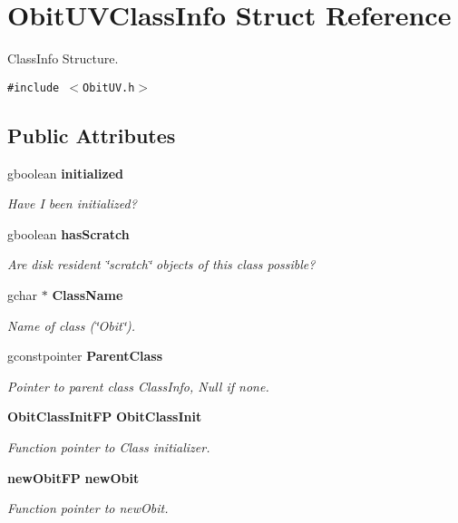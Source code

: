 \section{Obit\-UVClass\-Info Struct Reference}
\label{structObitUVClassInfo}
Class\-Info Structure.  


{\tt \#include $<$Obit\-UV.h$>$}

\subsection*{Public Attributes}
\begin{CompactItemize}
\item 
gboolean {\bf initialized}
\begin{CompactList}\small\item\em Have I been initialized? \item\end{CompactList}\item 
gboolean {\bf has\-Scratch}
\begin{CompactList}\small\item\em Are disk resident \char`\"{}scratch\char`\"{} objects of this class possible? \item\end{CompactList}\item 
gchar $\ast$ {\bf Class\-Name}
\begin{CompactList}\small\item\em Name of class (\char`\"{}Obit\char`\"{}). \item\end{CompactList}\item 
gconstpointer {\bf Parent\-Class}
\begin{CompactList}\small\item\em Pointer to parent class Class\-Info, Null if none. \item\end{CompactList}\item 
{\bf Obit\-Class\-Init\-FP} {\bf Obit\-Class\-Init}
\begin{CompactList}\small\item\em Function pointer to Class initializer. \item\end{CompactList}\item 
{\bf new\-Obit\-FP} {\bf new\-Obit}
\begin{CompactList}\small\item\em Function pointer to new\-Obit. \item\end{CompactList}\item 

\end{CompactItemize}
